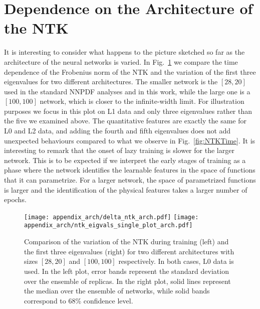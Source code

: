 \section{Dependence on the Architecture of the NTK}
\label{sec:NTKArchDep}

It is interesting to consider what happens to the picture sketched so far as the
architecture of the neural networks is varied. In Fig.~\ref{fig:NTKTimeDiffArch}
we compare the time dependence of the Frobenius norm of the NTK and the
variation of the first three eigenvalues for two different architectures. The
smaller network is the $[28,20]$ used in the standard NNPDF analyses and in this
work, while the large one is a $[100,100]$ network, which is closer to the
infinite-width limit. For illustration purposes we focus in this plot on L1 data
and only three eigenvalues rather than the five we examined above. The
quantitative features are exactly the same for L0 and L2 data, and adding the
fourth and fifth eigenvalues does not add unexpected behaviours compared to what
we observe in Fig.~\ref{fig:NTKTime}. It is interesting to remark that the onset
of lazy training is slower for the larger network. This is to be expected if we
interpret the early stages of training as a phase where the network identifies
the learnable features in the space of functions that it can parametrize. For a
larger network, the space of parametrized functions is larger and the
identification of the physical features takes a larger number of epochs. 
\begin{figure}[t]
  \centering
  \texttt{[image: appendix\_arch/delta\_ntk\_arch.pdf]}
  \texttt{[image: appendix\_arch/ntk\_eigvals\_single\_plot\_arch.pdf]}
  \caption{Comparison of the variation of the NTK during training (left) and the
  first three eigenvalues (right) for two different architectures with sizes
  $[28,20]$ and $[100,100]$ respectively. In both cases, L0 data is used. In the
  left plot, error bands represent the standard deviation over the ensemble of
  replicas. In the right plot, solid lines represent the median over the
  ensemble of networks, while solid bands correspond to 68\% confidence level.}
  \label{fig:NTKTimeDiffArch}
\end{figure}

\FloatBarrier